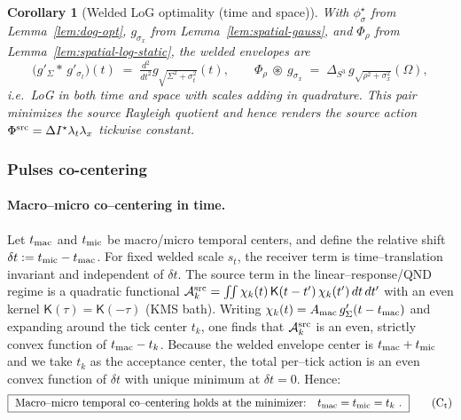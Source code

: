 \documentclass[10pt]{article}
\theoremstyle{definition}
\theoremstyle{plain}
\newtheorem{corollary}{Corollary}[section]
\begin{document}
\begin{corollary}[Welded LoG optimality (time and space)]
\label{cor:welded-log}
With $\phi^\star_\sigma$ from Lemma~\ref{lem:dog-opt}, $g_{\sigma_x}$ from
Lemma~\ref{lem:spatial-gauss}, and $\Phi_\rho$ from Lemma~\ref{lem:spatial-log-static},
the welded envelopes are
\[
\big(g'_{\Sigma}{*}\,g'_{\sigma_t}\big)(t)\;=\;\tfrac{d^2}{dt^2}g_{\sqrt{\Sigma^2+\sigma_t^2}}(t),
\qquad
\Phi_\rho\ \circledast\ g_{\sigma_x}\;=\;\Delta_{S^3}\,g_{\sqrt{\rho^2+\sigma_x^2}}(\Omega),
\]
i.e.\ \emph{LoG} in both time and space with scales adding in quadrature. This pair
minimizes the source Rayleigh quotient and hence renders the source action
$\Phi^{\rm src}=\Delta I^\star\lambda_t\lambda_x$ tickwise constant.
\end{corollary}

\subsubsection*{Pulses co-centering}\label{subsubsec:uom-main-009}

\paragraph{Macro–micro co–centering in time.}\label{par:uom-main-061}
Let \(t_{\rm mac}\) and \(t_{\rm mic}\) be macro/micro temporal centers, and define the relative shift \(\delta t:=t_{\rm mic}-t_{\rm mac}\).
For fixed welded scale \(s_t\), the receiver term is time–translation invariant and independent of \(\delta t\). The source term in the linear–response/QND regime is a quadratic functional
\(
\mathcal A^{\rm src}_k=\iint \chi_k(t)\,\mathsf K(t-t')\,\chi_k(t')\,dt\,dt'
\)
with an even kernel \(\mathsf K(\tau)=\mathsf K(-\tau)\) (KMS bath). Writing \(\chi_k(t)=A_{\rm mac}\,g'_{\Sigma}(t-t_{\rm mac})\) and expanding around the tick center \(t_k\), one finds that \(\mathcal A^{\rm src}_k\) is an even, strictly convex function of \(t_{\rm mac}-t_k\). Because the welded envelope center is \(t_{\rm mac}+t_{\rm mic}\) and we take \(t_k\) as the acceptance center, the total per–tick action is an even convex function of \(\delta t\) with unique minimum at \(\delta t=0\).
Hence:
\begin{equation}
\boxed{\ \text{Macro–micro temporal co–centering holds at the minimizer:}\quad t_{\rm mac}=t_{\rm mic}=t_k\ .\ }
\tag{C\textsubscript{t}}\label{eq:Ct}
\end{equation}
\end{document}
